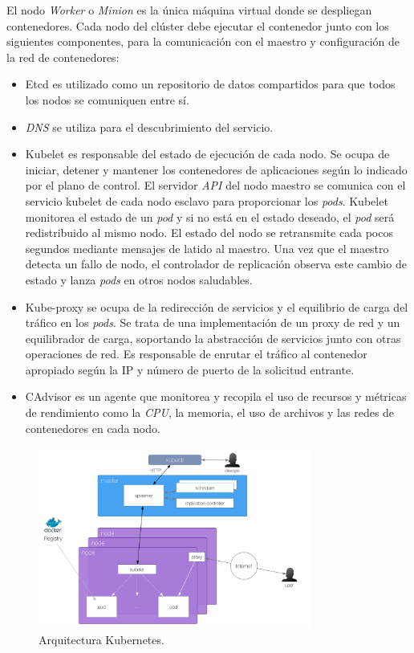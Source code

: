 El nodo \textit{Worker} o \textit{Minion} es la única máquina virtual donde se despliegan contenedores. Cada nodo del clúster debe ejecutar el contenedor junto con los siguientes componentes, para la comunicación con el maestro y configuración de la red de contenedores:
\begin{itemize}
\item Etcd es utilizado como un repositorio de datos compartidos para que todos los nodos se comuniquen entre sí.
\item \textit{DNS} se utiliza para el descubrimiento del servicio.
\item Kubelet es responsable del estado de ejecución de cada nodo. Se ocupa de iniciar, detener y mantener los contenedores de aplicaciones según lo indicado por el plano de control. El servidor \textit{API} del nodo maestro se comunica con el servicio kubelet de cada nodo esclavo para proporcionar los \textit{pods}. Kubelet monitorea el estado de un \textit{pod} y si no está en el estado deseado, el \textit{pod} será redistribuido al mismo nodo. El estado del nodo se retransmite cada pocos segundos mediante mensajes de latido al maestro. Una vez que el maestro detecta un fallo de nodo, el controlador de replicación observa este cambio de estado y lanza \textit{pods} en otros nodos saludables.
\item Kube-proxy se ocupa de la redirección de servicios y el equilibrio de carga del tráfico en los \textit{pods}. Se trata de una implementación de un proxy de red y un equilibrador de carga, soportando la abstracción de servicios junto con otras operaciones de red. Es responsable de enrutar el tráfico al contenedor apropiado según la IP y número de puerto de la solicitud entrante.
\item CAdvisor es un agente que monitorea y recopila el uso de recursos y métricas de rendimiento como la \textit{CPU}, la memoria, el uso de archivos y las redes de contenedores en cada nodo.
\end{itemize}

\begin{figure}[H]
\centering
\includegraphics[width=0.8\textwidth]{images/figures/kubernetesarchitecture.png}
\caption{Arquitectura Kubernetes.\label{fig:figure_placement_example}}
\end{figure}

